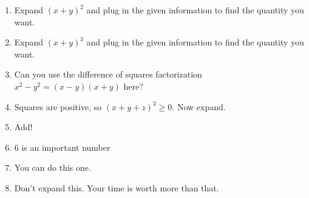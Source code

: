\documentclass{article}
\theoremstyle{definition}
\theoremstyle{remark}
\begin{document}
\begin{enumerate}
    \item Expand $(x+y)^2$ and plug in the given information to find the quantity you want.
    \item Expand $(x+y)^3$ and plug in the given information to find the quantity you want. 
    \item Can you use the difference of squares factorization $x^2-y^2 = (x-y)(x+y)$ here?
    \item Squares are positive, so $(x+y+z)^2\geq 0$. Now expand.
    \item Add!
    \item 6 is an important number
    \item You can do this one.
    \item Don't expand this. Your time is worth more than that.
\end{enumerate}
\end{document}
